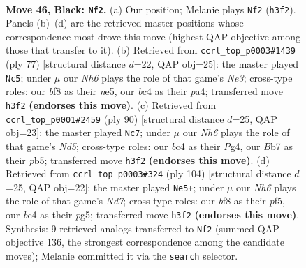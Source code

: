 \documentclass[11pt]{article}
\begin{document}
\clearpage

\begin{figure}[p]\centering
\begin{subfigure}{0.46\textwidth}\centering
\resizebox{\linewidth}{!}{%
\newchessgame
\chessboard[
  setfen={5B2/pb1p3r/8/5k2/2B5/6Rn/PPK5/8 b - - 13 46},
  showmover=false,
  pgfstyle=straightmove, color=movearrow, markmove={h3-f2}
]}
\caption{}
\end{subfigure}\hfill
\begin{subfigure}{0.46\textwidth}\centering
\resizebox{\linewidth}{!}{%
\newchessgame
\chessboard[
  setfen={2k5/4R3/4n2r/p2pN3/P7/8/1P3PK1/8 b - - 1 39},
  showmover=false,
  pgfstyle=straightmove, color=movearrow, markmove={e6-c5}
]}
\caption{}
\end{subfigure}
\\[4pt]
\begin{subfigure}{0.46\textwidth}\centering
\resizebox{\linewidth}{!}{%
\newchessgame
\chessboard[
  setfen={8/6k1/8/pp1NR3/3r2PP/5K2/3b4/8 w - - 2 46},
  showmover=false,
  pgfstyle=straightmove, color=movearrow, markmove={d5-c7}
]}
\caption{}
\end{subfigure}\hfill
\begin{subfigure}{0.46\textwidth}\centering
\resizebox{\linewidth}{!}{%
\newchessgame
\chessboard[
  setfen={8/R2Nbk2/3r4/5pp1/8/4P3/5PK1/8 w - - 14 53},
  showmover=false,
  pgfstyle=straightmove, color=movearrow, markmove={d7-e5}
]}
\caption{}
\end{subfigure}
\caption{\textbf{Move 46, Black: \texttt{Nf2}.} (a) Our position; Melanie plays \texttt{Nf2} (\texttt{h3f2}). Panels (b)--(d) are the retrieved master positions whose correspondence most drove this move (highest QAP objective among those that transfer to it). (b) Retrieved from \texttt{ccrl\_top\_p0003\#1439} (ply 77) [structural distance $d$=22, QAP obj=25]: the master played \texttt{Nc5}; under $\mu$ our \emph{Nh6} plays the role of that game's \emph{Ne3}; cross-type roles: our \emph{b}f8 as their \emph{n}e5, our \emph{b}c4 as their \emph{p}a4; transferred move \texttt{h3f2} \textbf{(endorses this move)}. (c) Retrieved from \texttt{ccrl\_top\_p0001\#2459} (ply 90) [structural distance $d$=25, QAP obj=23]: the master played \texttt{Nc7}; under $\mu$ our \emph{Nh6} plays the role of that game's \emph{Nd5}; cross-type roles: our \emph{b}c4 as their \emph{P}g4, our \emph{B}b7 as their \emph{p}b5; transferred move \texttt{h3f2} \textbf{(endorses this move)}. (d) Retrieved from \texttt{ccrl\_top\_p0003\#324} (ply 104) [structural distance $d$=25, QAP obj=22]: the master played \texttt{Ne5+}; under $\mu$ our \emph{Nh6} plays the role of that game's \emph{Nd7}; cross-type roles: our \emph{b}f8 as their \emph{p}f5, our \emph{b}c4 as their \emph{p}g5; transferred move \texttt{h3f2} \textbf{(endorses this move)}. Synthesis: 9 retrieved analogs transferred to \texttt{Nf2} (summed QAP objective 136, the strongest correspondence among the candidate moves); Melanie committed it via the \texttt{search} selector.}
\label{fig:thought-m91}
\end{figure}
\end{document}
